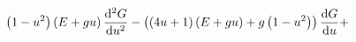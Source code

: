 \begin{equation}
\label{G(u)k=1}
\left(1-u^2\right)\left(E+gu\right) \frac{{\rm d}^2 G}{{\rm d} u^2} 
- \left(\left(4u+1\right)\left(E+gu\right) + g\left(1-u^2\right)\right) 
\frac{{\rm d} G}{{\rm d} u} + 
\end{equation}

